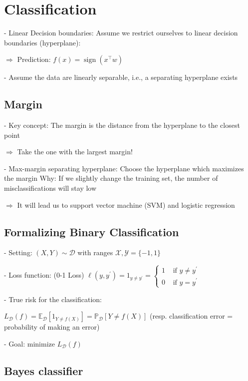 \section*{Classification}
- Linear Decision boundaries: Assume we restrict ourselves to linear decision boundaries (hyperplane):

$\Rightarrow$ Prediction: $f(x)=\operatorname{sign}\left(x^{\top} w\right)$

- Assume the data are linearly separable, i.e., a separating hyperplane exists


\subsection*{Margin}
- Key concept: The margin is the distance from the hyperplane to the closest point


$\Rightarrow$ Take the one with the largest margin!

- Max-margin separating hyperplane: 
Choose the hyperplane which maximizes the margin
Why: If we slightly change the training set, the number of misclassifications will stay low

$\Rightarrow$ It will lead us to support vector machine (SVM) and logistic regression


\subsection*{Formalizing Binary Classification}

- Setting: $(X, Y) \sim \mathscr{D}$ with ranges $\mathscr{X}, \mathscr{Y}=\{-1,1\}$

- Loss function: (0-1 Loss) $\ell\left(y, y^{\prime}\right)=1_{y \neq y^{\prime}}= \begin{cases}1 & \text { if } y \neq y^{\prime} \\ 0 & \text { if } y=y^{\prime}\end{cases}$

- True risk for the classification:

$
L_{\mathscr{D}}(f)=\mathbb{E}_{\mathscr{D}}\left[1_{Y \neq f(X)}\right]=\mathbb{P}_{\mathscr{D}}[Y \neq f(X)]
$ (resp. classification error = probability of making an error)

- Goal: minimize $L_{\mathscr{D}}(f)$

\subsection*{Bayes classifier}


